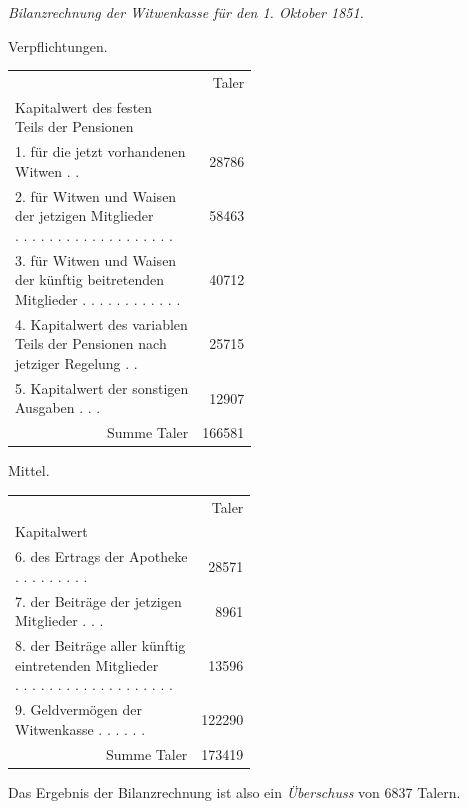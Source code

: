 \Needspace{210pt}
\begin{center}
\textit{Bilanzrechnung der Witwenkasse für den 1. Oktober 1851.}\par\smallskip
\footnotesize\setlength{\tabcolsep}{1pt}
\begin{minipage}[t]{.48\linewidth}
\centering
Verpflichtungen.\par
\begin{tabular}{l r}
&Taler\\
\shortstack[l]{Kapitalwert des festen\\Teils der Pensionen}&\\
\shortstack[l]{1. für die jetzt vorhandenen\\Witwen . .}&28786\\
\shortstack[l]{2. für Witwen und Waisen\\der jetzigen Mitglieder\\. . . . . . . . . . . . . . . . . . .}&58463\\
\shortstack[l]{3. für Witwen und Waisen\\der künftig beitretenden\\Mitglieder . . . . . . . . . . . .}&40712\\
\shortstack[l]{4. Kapitalwert des variablen\\Teils der Pensionen nach\\jetziger Regelung . .}&25715\\
\shortstack[l]{5. Kapitalwert der sonstigen\\Ausgaben . . .}&12907\\\cline{1-2}
\multicolumn{1}{r}{Summe Taler}&166581
\end{tabular}
\end{minipage}\hfill\vrule\hfill
\begin{minipage}[t]{.48\linewidth}
\centering
Mittel.\par
\begin{tabular}{l r}
&Taler\\
Kapitalwert&\\
\shortstack[l]{6. des Ertrags der Apotheke\\. . . . . . . . .}&28571\\
\shortstack[l]{7. der Beiträge der jetzigen\\Mitglieder . . .}&8961\\
\shortstack[l]{8. der Beiträge aller künftig\\eintretenden Mitglieder\\. . . . . . . . . . . . . . . . . . .}&13596\\
\shortstack[l]{9. Geldvermögen der\\Witwenkasse . . . . . .}&122290\\\cline{1-2}
\multicolumn{1}{r}{Summe Taler}&173419
\end{tabular}\par\medskip
Das Ergebnis der Bilanzrechnung ist also ein \textit{Überschuss} von 6837 Talern.
\end{minipage}
\end{center}
